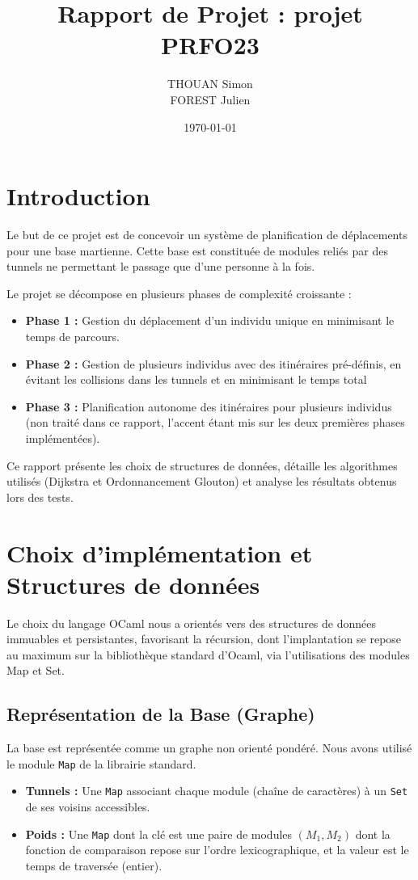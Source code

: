 \documentclass[a4paper,11pt]{article}
\title{\textbf{Rapport de Projet : projet PRFO23}}
\author{THOUAN Simon \\ \small{FOREST Julien}}
\date{\today}
\begin{document}
\tableofcontents
\newpage

\section{Introduction}

Le but de ce projet est de concevoir un système de planification de déplacements pour une base martienne. Cette base est constituée de modules reliés par des tunnels ne permettant le passage que d'une personne à la fois.

Le projet se décompose en plusieurs phases de complexité croissante :
\begin{itemize}
    \item \textbf{Phase 1 :} Gestion du déplacement d'un individu unique en minimisant le temps de parcours.
    \item \textbf{Phase 2 :} Gestion de plusieurs individus avec des itinéraires pré-définis, en évitant les collisions dans les tunnels et en minimisant le temps total
    \item \textbf{Phase 3 :} Planification autonome des itinéraires pour plusieurs individus (non traité dans ce rapport, l'accent étant mis sur les deux premières phases implémentées).
\end{itemize}

Ce rapport présente les choix de structures de données, détaille les algorithmes utilisés (Dijkstra et Ordonnancement Glouton) et analyse les résultats obtenus lors des tests.

\section{Choix d'implémentation et Structures de données}

Le choix du langage OCaml nous a orientés vers des structures de données immuables et persistantes, favorisant la récursion, dont l'implantation se repose
au maximum sur la bibliothèque standard d'Ocaml, via l'utilisations des modules Map et Set.

\subsection{Représentation de la Base (Graphe)}
La base est représentée comme un graphe non orienté pondéré. Nous avons utilisé le module \texttt{Map} de la librairie standard.
\begin{itemize}
    \item \textbf{Tunnels :} Une \texttt{Map} associant chaque module (chaîne de caractères) à un \texttt{Set} de ses voisins accessibles.
    \item \textbf{Poids :} Une \texttt{Map} dont la clé est une paire de modules $(M_1, M_2)$ dont la fonction de comparaison repose sur l'ordre 
    lexicographique, et la valeur est le temps de traversée (entier).
\end{itemize}
\end{document}
